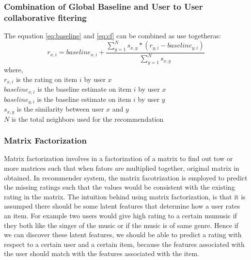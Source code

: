\subsubsection{Combination of Global Baseline and User to User collaborative fitering}
The equation \ref{eq:baseline} and \ref{eq:cf} can be combined as use togetheras:
\begin{equation}
	r_{x,i} = baseline_{x,i}+\frac{\sum_{y=1}^N s_{x,y}*(r_{y,i}-baseline_{y,i})}{\sum_{y=1}^N s_{x,y}}
\end{equation}
where,\\
$r_{x,i}$ is the rating on item $i$ by user $x$ \\
$baseline_{x,i}$ is the baseline estimate on item $i$ by user $x$ \\
$baseline_{y,i}$ is the baseline estimate on item $i$ by user $y$ \\
$s_{x,y}$ is the similarity between user $x$ and $y$ \\ 
$N$ is the total neighbors used for the recommendation
\subsubsection{Matrix Factorization}
Matrix factorization \cite{latent} involves in a factorization of a matrix to find out tow or more matrices such that when fators are multiplied together, original matrix in obtained. In recommender system, the matrix facotrization is employed to predict the missing ratings such that the values would be consistent with the existing rating in the matrix. The intuition behind using matrix factorization, is that it is assumped there should be some latent features that determine how a user rates an item. For example two users would give high rating to a certain mumusic if they both like the singer of the music or if the music is of same genre. Hence if we can discover these latent features, we should be able to predict a rating with respect to a certain user and a certain item, because the features associated with the user should match with the features associated with the item.

